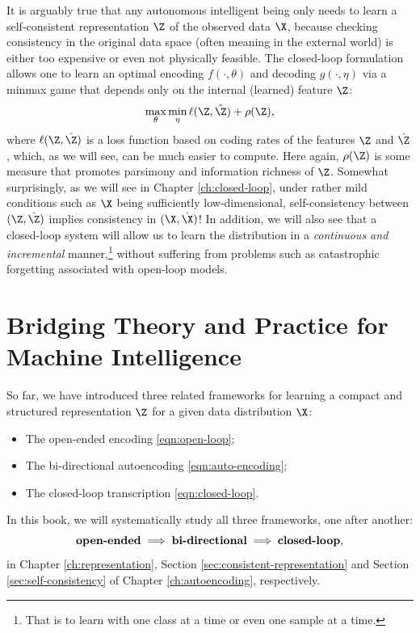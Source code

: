 \documentclass[../../book-main.tex]{subfiles}
\begin{document}
It is arguably true that any  autonomous intelligent being only needs to learn a self-consistent representation $\Z$ of the observed data $\X$, because checking consistency in the original data space (often meaning in the external world) is either too expensive or even not physically feasible. The closed-loop formulation allows one to learn an optimal encoding $f(\cdot, \theta)$ and decoding $g(\cdot, \eta)$ via a minmax game that depends only on the internal (learned) feature $\Z$:
\begin{equation}
\max_{\theta}\min_{\eta} \ell( \Z, \hat \Z) + \rho(\Z), 
   \label{eqn:closed-loop-objective}
\end{equation}
where $\ell( \Z, \hat \Z)$ is a loss function based on coding rates of the features $\Z$ and $\hat \Z$, which, as we will see, can be much easier to compute. Here again, $\rho(\Z)$ is some measure that promotes parsimony and information richness of $\Z$. Somewhat surprisingly, as we will see in Chapter \ref{ch:closed-loop}, under rather mild conditions such as $\X$ being sufficiently low-dimensional, self-consistency between $(\Z, \hat \Z)$ implies consistency in $(\X, \hat \X)$! In addition, we will also see that a closed-loop system will allow us to learn the distribution in a {\em continuous and incremental} manner,\footnote{That is to learn with one class at a time or even one sample at a time.} without suffering from problems such as catastrophic forgetting associated with open-loop models. 

\section{Bridging Theory and Practice for Machine Intelligence}
So far, we have introduced three related  frameworks for learning a compact and structured representation $\Z$ for a given data distribution $\X$: 
\begin{itemize}
\item The open-ended encoding \eqref{eqn:open-loop};
\item The bi-directional autoencoding \eqref{eqn:auto-encoding};
\item The closed-loop transcription \eqref{eqn:closed-loop}.
\end{itemize}
In this book, we will systematically study all three frameworks, one after another:
\begin{equation}
    \mbox{\textbf{open-ended}} \; \Longrightarrow \; 
    \mbox{\textbf{bi-directional}} \;  \Longrightarrow \; \mbox{\textbf{closed-loop}},
\end{equation}
in Chapter \ref{ch:representation}, Section \ref{sec:consistent-representation} and Section \ref{sec:self-consistency} of Chapter \ref{ch:autoencoding}, respectively.
\end{document}
